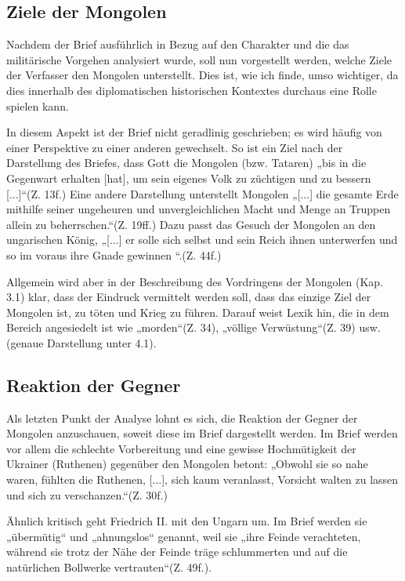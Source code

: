 \documentclass{../../sem_paper}
\begin{document}
\subsection{Ziele der Mongolen}
Nachdem der Brief ausführlich in Bezug auf den Charakter und die das militärische
Vorgehen analysiert wurde, soll nun vorgestellt werden, welche Ziele der Verfasser den
Mongolen unterstellt. Dies ist, wie ich finde, umso wichtiger, da dies innerhalb des
diplomatischen historischen Kontextes durchaus eine Rolle spielen kann.

In diesem Aspekt ist der Brief nicht geradlinig geschrieben; es wird häufig von einer
Perspektive zu einer anderen gewechselt. So ist ein Ziel nach der Darstellung des Briefes, dass Gott die Mongolen (bzw.
Tataren) „bis in die Gegenwart erhalten [hat], um sein eigenes Volk zu züchtigen und zu
bessern [...]“(Z. 13f.) Eine andere Darstellung unterstellt Mongolen „[...] die
gesamte Erde mithilfe seiner ungeheuren und unvergleichlichen Macht und Menge an
Truppen allein zu beherrschen.“(Z. 19ff.) Dazu passt das Gesuch der Mongolen an den
ungarischen König, „[...] er solle sich selbst und sein Reich ihnen unterwerfen und so
im voraus ihre Gnade gewinnen “.(Z. 44f.)

Allgemein wird aber in der Beschreibung des Vordringens der Mongolen (Kap. 3.1)
klar, dass der Eindruck vermittelt werden soll, dass das einzige Ziel der Mongolen ist,
zu töten und Krieg zu führen. Darauf weist Lexik hin, die in dem Bereich
angesiedelt ist wie „morden“(Z. 34), „völlige Verwüstung“(Z. 39) usw. (genaue
Darstellung unter 4.1).

\subsection{Reaktion der Gegner}
Als letzten Punkt der Analyse lohnt es sich, die Reaktion der Gegner der Mongolen
anzuschauen, soweit diese im Brief dargestellt werden. Im Brief werden vor allem die
schlechte Vorbereitung und eine gewisse Hochmütigkeit der Ukrainer (Ruthenen)
gegenüber den Mongolen betont: „Obwohl sie so nahe waren, fühlten die Ruthenen,
[...], sich kaum veranlasst, Vorsicht walten zu lassen und sich zu verschanzen.“(Z. 30f.)

Ähnlich kritisch geht Friedrich II. mit den Ungarn um. Im Brief werden sie
„übermütig“ und „ahnungslos“ genannt, weil sie „ihre Feinde verachteten, während sie
trotz der Nähe der Feinde träge schlummerten und auf die natürlichen Bollwerke
vertrauten“(Z. 49f.).
\end{document}

